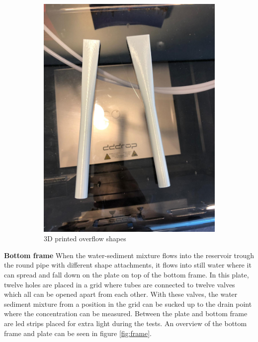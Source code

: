 \begin{figure}[ht!]
\begin{subfigure}{.5\textwidth}
  \includegraphics[width=.8\linewidth]{Images/overflow_shapes_3d.png}
  \caption{3D printed overflow shapes}
\end{subfigure}
\caption{}
\label{fig:subshapes}
\end{figure}


\noindent\textbf{Bottom frame} \newline
\noindent When the water-sediment mixture flows into the reservoir trough the round pipe with different shape attachments, it flows into still water where it can spread and fall down on the plate on top of the bottom frame. In this plate, twelve holes are placed in a grid where tubes are connected to twelve valves which all can be opened apart from each other. With these valves, the water sediment mixture from a position in the grid can be sucked up to the drain point where the concentration can be measured. Between the plate and bottom frame are led strips placed for extra light during the tests. An overview of the bottom frame and plate can be seen in figure \ref{fig:frame}.

